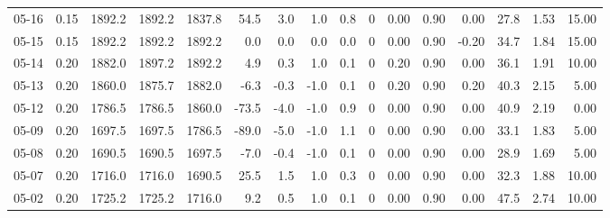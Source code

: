 \begin{threeparttable}
{\begin{tabular}{lrrrrrrrrrrrrrrr}
  05-16 &     0.15 & 1892.2 & 1892.2 & 1837.8 &       54.5 &            3.0 &                      1.0 &                 0.8 &              0 &       0.00 &      0.90 &           0.00 &             27.8 &            1.53 &                  15.00 \\
  05-15 &     0.15 & 1892.2 & 1892.2 & 1892.2 &        0.0 &            0.0 &                      0.0 &                 0.0 &              0 &       0.00 &      0.90 &          -0.20 &             34.7 &            1.84 &                  15.00 \\
  05-14 &     0.20 & 1882.0 & 1897.2 & 1892.2 &        4.9 &            0.3 &                      1.0 &                 0.1 &              0 &       0.20 &      0.90 &           0.00 &             36.1 &            1.91 &                  10.00 \\
  05-13 &     0.20 & 1860.0 & 1875.7 & 1882.0 &       -6.3 &           -0.3 &                     -1.0 &                 0.1 &              0 &       0.20 &      0.90 &           0.20 &             40.3 &            2.15 &                   5.00 \\
  05-12 &     0.20 & 1786.5 & 1786.5 & 1860.0 &      -73.5 &           -4.0 &                     -1.0 &                 0.9 &              0 &       0.00 &      0.90 &           0.00 &             40.9 &            2.19 &                   0.00 \\
  05-09 &     0.20 & 1697.5 & 1697.5 & 1786.5 &      -89.0 &           -5.0 &                     -1.0 &                 1.1 &              0 &       0.00 &      0.90 &           0.00 &             33.1 &            1.83 &                   5.00 \\
  05-08 &     0.20 & 1690.5 & 1690.5 & 1697.5 &       -7.0 &           -0.4 &                     -1.0 &                 0.1 &              0 &       0.00 &      0.90 &           0.00 &             28.9 &            1.69 &                   5.00 \\
  05-07 &     0.20 & 1716.0 & 1716.0 & 1690.5 &       25.5 &            1.5 &                      1.0 &                 0.3 &              0 &       0.00 &      0.90 &           0.00 &             32.3 &            1.88 &                  10.00 \\
  05-02 &     0.20 & 1725.2 & 1725.2 & 1716.0 &        9.2 &            0.5 &                      1.0 &                 0.1 &              0 &       0.00 &      0.90 &           0.00 &             47.5 &            2.74 &                  10.00 \\

\end{tabular}}
\end{threeparttable}
